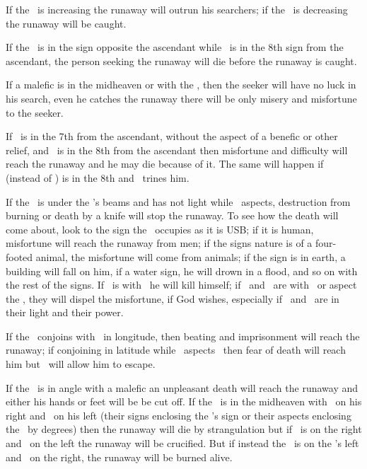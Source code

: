 If the \Moon\, is increasing the runaway will outrun his searchers; if the \Moon\, is decreasing the runaway will be caught. 

If the \Sun\, is in the sign opposite the ascendant while \Saturn\, is in the 8th sign from the ascendant, the person seeking the runaway will die before the runaway is caught. 

If a malefic is in the midheaven or with the \Sun, then the seeker will have no luck in his search, even he catches the runaway there will be only misery and misfortune to the seeker.

If \Moon\, is in the 7th from the ascendant, without the aspect of a benefic or other relief, and \Mars\, is in the 8th from the ascendant then misfortune and difficulty will reach the runaway and he may die because of it. The same will happen if \Mercury\, (instead of \Mars) is in the 8th and \Mars\, trines him.

If the \Moon\, is under the \Sun's beams and has not light while \Mars\, aspects,
destruction from burning or death by a knife will stop the runaway. To see how the death will come about, look to the sign the \Moon\, occupies as it is USB; if it is human, misfortune will reach the runaway from men; if the signs nature is of a four-footed animal, the misfortune will come from animals; if the sign is in earth, a building will fall on him, if a water sign, he will drown in a flood, and so on with the rest of the signs. If \Mercury\, is with \Saturn\, he will kill himself; if \Venus\, and \Jupiter\, are with \Mercury\, or aspect the \Moon, they will dispel the misfortune, if God wishes, especially if \Jupiter\, and \Venus\, are in their light and their power. 

If the \Moon\, conjoins with \Mars\, in longitude, then beating and imprisonment will reach the runaway; if conjoining in latitude while \Jupiter\, aspects \Mars\, 
  then fear of death will reach him but \Jupiter\, will allow him to escape.
  
If the \Moon\, is in angle with a malefic an unpleasant death will reach the runaway and either his hands or feet will be be cut off. If the \Moon\, is in the midheaven with \Mars\, on his right and \Saturn\, on his left (their signs enclosing the \Moon's sign or their aspects enclosing the \Moon\, by degrees) then the runaway will die by strangulation but if \Saturn\, is on the right and \Mars\, on the left the runaway will be crucified. But if instead the \Sun\, is on the \Moon's left and \Mars\, on the right, the runaway will be burned alive.

